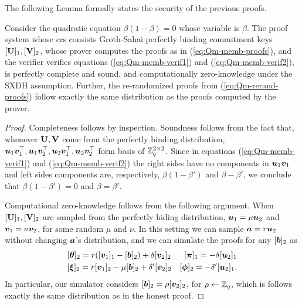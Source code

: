  The following Lemma formally states the security of the previous proofs.
\begin{lemma} \label{lemma:Qm-memb}
Consider the quadratic equation $\beta(1-\beta) = 0$ whose variable is $\beta$. 
The proof system whose crs consists Groth-Sahai perfectly binding commitment keys $[\mathbf{{U}}]_1,[\mathbf{{V}}]_2$, whose prover computes the proofs as in (\ref{eq:Qm-memb-proofs}), and the verifier verifies equations (\ref{eq:Qm-memb-verif1}) and (\ref{eq:Qm-memb-verif2}), is perfectly complete and sound, and computationally zero-knowledge under the SXDH assumption.
Further, the re-randomized proofs from (\ref{eq:Qm-rerand-proofs}) follow exactly the same distribution as the proofs computed by the prover.
\end{lemma}
\begin{proof}
Completeness follows by inspection. Soundness follows from the fact that, whenever $\mathbf{{U}},\mathbf{{V}}$ come from the perfectly binding distribution, ${\boldsymbol{u}}_1{\boldsymbol{v}}_1^\top,{\boldsymbol{u}}_1{\boldsymbol{v}}_2^\top,\allowbreak{\boldsymbol{u}}_2{\boldsymbol{v}}_1^\top,\allowbreak{\boldsymbol{u}}_2{\boldsymbol{v}}_2^\top$ form basis of $\mathbb{Z}_q^{2\times 2}$. Since in equations (\ref{eq:Qm-memb-verif1}) and (\ref{eq:Qm-memb-verif2}) the right sides have no components in ${\boldsymbol{u}}_1{\boldsymbol{v}}_1$ and left sides components are, respectively, $\beta(1-\beta')$ and $\beta-\beta'$, we conclude that $\beta(1-\beta') = 0$ and $\beta=\beta'$.

Computational zero-knowledge follows from the following argument.
When $[\mathbf{{U}}]_1,[\mathbf{{V}}]_2$ are sampled from the perfectly hiding distribution, ${\boldsymbol{u}}_1 = \mu{\boldsymbol{u}}_2$ and ${\boldsymbol{v}}_1 = \nu{\boldsymbol{v}}_2$, for some random $\mu$ and $\nu$. In this setting we can sample ${\boldsymbol{a}} = r{\boldsymbol{u}}_2$ without changing ${\boldsymbol{a}}$'s distribution, and we can simulate the proofs for any $[{\boldsymbol{b}}]_2$ as 
\begin{align} \label{eq:Qm-sim-proofs}
&[{\boldsymbol{\theta}}]_2 = r([{\boldsymbol{v}}_1]_1-[{\boldsymbol{b}}]_2)+\delta[{\boldsymbol{v}}_2]_2
&[{\boldsymbol{\pi}}]_1 = -\delta[{\boldsymbol{u}}_2]_1 \nonumber\\
&[{\boldsymbol{\xi}}]_2 = r[{\boldsymbol{v}}_1]_2-\mu[{\boldsymbol{b}}]_2+\delta'[{\boldsymbol{v}}_2]_2
&[{\boldsymbol{\phi}}]_2 = -\delta'[{\boldsymbol{u}}_2]_1.
\end{align} 
In particular, our simulator considers $[{\boldsymbol{b}}]_2=\rho[{\boldsymbol{v}}_2]_2$, for $\rho\gets\mathbb{Z}_q$, which is follows exactly the same distribution as in the honest proof.


\end{proof}
